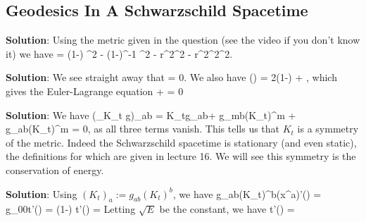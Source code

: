\subsection{Geodesics In A Schwarzschild Spacetime}


\textbf{Solution}: Using the metric given in the question (see the video if you don't know it) we have 
\bse 
    \cL = \bigg(1-\bigg) ^2 - \bigg(1-\bigg)^{-1} ^2 - r^2\dot{\theta}^2 - r^2\sin^2\theta \dot{\varphi}^2.
\ese 


\textbf{Solution}: We see straight away that 
\bse 
     = 0.
\ese 
We also have 
\bse 
    \bigg(\bigg) = 2\bigg(1-\bigg)  + ,
\ese 
which gives the Euler-Lagrange equation 
\bse 
     +  = 0
\ese 


\textbf{Solution}: We have 
\bse 
    (\cL_{K_t} g)_{ab} = K_t\la g_{ab}\ra + g_{mb}(K_t)^m + g_{ab}(K_t)^m = 0,
\ese 
as all three terms vanish. This tells us that $K_t$ is a symmetry of the metric. Indeed the Schwarzschild spacetime is stationary (and even static), the definitions for which are given in lecture 16. We will see this symmetry is the conservation of energy.


\textbf{Solution}: Using $(K_t)_a := g_{ab}(K_t)^b$, we have 
\bse 
    g_{ab}(K_t)^b(x^a)'(\lambda) = g_{00}t'(\lambda) = \bigg(1-\bigg) t'(\lambda) = 
\ese 
Letting $\sqrt{E}$ be the constant, we have 
\bse 
    t'(\lambda) = 
\ese 

